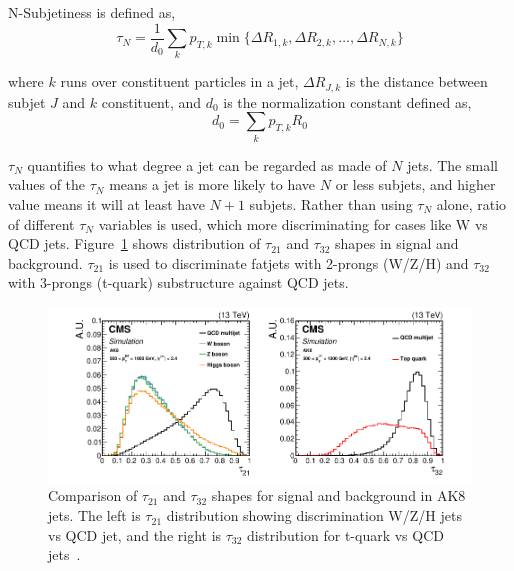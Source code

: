 N-Subjetiness is defined as,
%
\begin{equation}
  \tau_N = \frac{1}{d_0} \sum_k p_{T,k} \min \{ \Delta R_{1,k}, \Delta R_{2,k}, \ldots , \Delta R_{N,k} \}
\end{equation}

where \( k \) runs over constituent particles in a jet, \( \Delta R_{J,k} \)
is the distance between subjet \( J \) and \( k \) constituent, and \( d_0 \)
is the normalization constant defined as,
%
\begin{equation}
  d_0 = \sum_k p_{T,k} R_0
\end{equation}

\( \tau_N \) quantifies to what degree a jet can be regarded as made of \( N \) jets.
The small values of the \( \tau_N \) means a jet is more likely to have
\( N \) or less subjets, and higher value means it will at least have \( N + 1\)
subjets. Rather than using \( \tau_N \) alone, ratio of different \( \tau_N \)
variables is used, which more discriminating for cases like W vs QCD jets.
Figure~\ref{fig:cms-tau21-tau32-comparison} shows distribution of
\( \tau_{21} \) and \( \tau_{32} \) shapes in signal and background.
\( \tau_{21} \) is used to discriminate fatjets with 2-prongs (W/Z/H)
and \( \tau_{32} \) with 3-prongs (t-quark) substructure against QCD jets.

\begin{figure}[!ht]
  \centering
  \includegraphics[width=\textwidth]{figures/CMS_JME_18_002_Figure_003.pdf}
  \caption[Comparison of \( \tau_{21} \) and \( \tau_{32} \) shapes for signal and background in AK8 jets]%
  {Comparison of \( \tau_{21} \) and \( \tau_{32} \) shapes for signal and background in AK8 jets.
    The left is \( \tau_{21} \) distribution showing discrimination W/Z/H jets
    vs QCD jet, and the right is \( \tau_{32} \) distribution for t-quark vs
    QCD jets~\cite{cms-jme-deep-tagger}.}%
  \label{fig:cms-tau21-tau32-comparison}
\end{figure}

